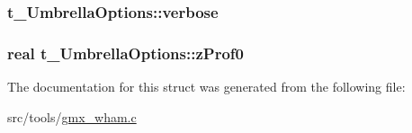 \hypertarget{structt__UmbrellaOptions_a4fbce55ab74535f9a87757bd46728e2b}{
\subsubsection[{verbose}]{ {\bf t\-\_\-\-Umbrella\-Options\-::verbose}}}\label{structt__UmbrellaOptions_a4fbce55ab74535f9a87757bd46728e2b}
\hypertarget{structt__UmbrellaOptions_a55bbb81d60b14198d918bb0ba59f0034}{
\subsubsection[{z\-Prof0}]{\setlength{\rightskip}{0pt plus 5cm}real {\bf t\-\_\-\-Umbrella\-Options\-::z\-Prof0}}}\label{structt__UmbrellaOptions_a55bbb81d60b14198d918bb0ba59f0034}


\-The documentation for this struct was generated from the following file\-:\begin{DoxyCompactItemize}
\item 
src/tools/\hyperlink{gmx__wham_8c}{gmx\-\_\-wham.\-c}\end{DoxyCompactItemize}
